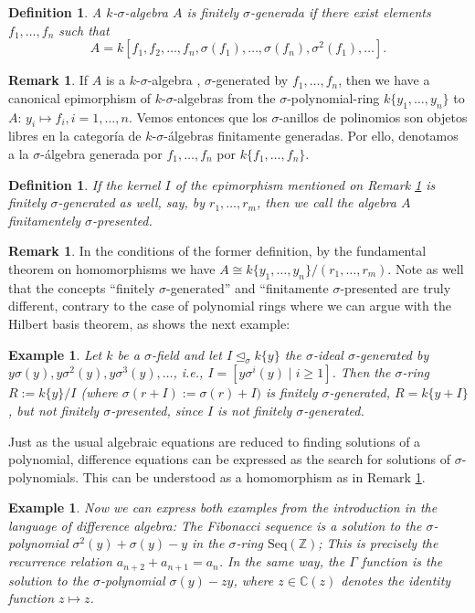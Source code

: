 \documentclass{article}
\def\Z{\mathbb{Z}}
\def\C{\mathbb{C}}
\def\s{\sigma}
\def\si{\unlhd_{\sigma}}
\theoremstyle{plain}
\newtheorem{ex}[Satz]{Example}
\newtheorem{defn}[Satz]{Definition}
\theoremstyle{definition}
\newtheorem{rem}[Satz]{Remark}
\begin{document}
\begin{defn}
A $k$-$\sigma$-algebra  $A$ is \emph{finitely $\sigma$-generada} if there exist elements $f_1, \ldots, f_n$ such that $$A = k[f_1,f_2,\ldots,f_n,\sigma(f_1),\ldots,\sigma(f_n),\sigma^2(f_1),\ldots].$$
\end{defn}

\begin{rem}\label{epipoli}
If $A$ is a $k$-$\sigma$-algebra , $\sigma$-generated by $f_1, \ldots, f_n$, then we have a canonical epimorphism of $k$-$\sigma$-algebras from the $\sigma$-polynomial-ring $k\{y_1, \ldots, y_n \}$ to $A$: $y_i \mapsto f_i, i = 1, \ldots, n$. Vemos entonces que los $\sigma$-anillos de polinomios son objetos libres en la categor\'ia de $k$-$\sigma$-\'algebras finitamente generadas. Por ello, denotamos a la $\sigma$-\'algebra  generada por $f_1, \ldots, f_n$ por $k\{f_1, \ldots, f_n\}$.
\end{rem}

\begin{defn}
If the kernel $I$ of the epimorphism mentioned on Remark \ref{epipoli} is finitely $\s$-generated as well, say, by $r_1, \ldots, r_m$, then we call the algebra $A$ \emph{finitamentely $\sigma$-presented}. 
\end{defn}

\begin{rem}
In the conditions of the former definition, by the fundamental theorem on homomorphisms we have $A \cong k\{y_1, \ldots, y_n\}/(r_1,\ldots,r_m)$. Note as well that the concepts ``finitely $\sigma$-generated'' and ``finitamente $\sigma$-presented are truly different, contrary to the case of polynomial rings where we can argue with the Hilbert basis theorem, as shows the next example:
\end{rem}

\begin{ex}
Let $k$ be a $\sigma$-field and let $I \si k\{y\} $ the $\sigma$-ideal $\s$-generated by $y\s(y), y\s^2(y), y\s^3(y), \ldots$, i.e., $I = [y \s^i(y) \mid i\geq 1]$. Then the $\sigma$-ring $R := k\{y\}/I$ (where $\s (r + I) := \s(r) + I)$ is 
finitely $\sigma$-generated, $R = k\{ y + I \}$, but not finitely $\sigma$-presented, since $I$ is not finitely $\sigma$-generated.
\end{ex}


Just as the usual algebraic equations are reduced to finding solutions of a polynomial, difference equations can be expressed as the search for solutions of $\s$-polynomials. This can be understood as a homomorphism as in Remark \ref{epipoli}.

\begin{ex}
Now we can express both examples from the introduction in the language of difference algebra:
The Fibonacci sequence is a solution to the $\s$-polynomial $\sigma^2(y) + \sigma(y) - y$ in the $\sigma$-ring  $\text{Seq}(\Z)$; This is precisely the recurrence relation $a_{n+2} + a_{n+1} = a_n$.
In the same way, the $\Gamma$ function is the solution to the $\s$-polynomial $\sigma(y) - zy$, where $z \in \C(z)$ denotes the identity function $z \mapsto z$.
\end{ex}
\end{document}
